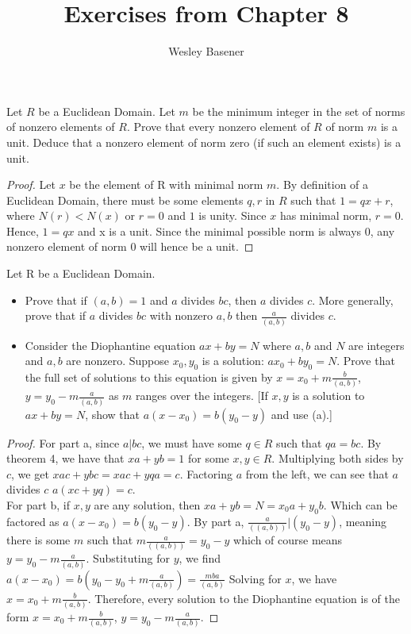 \documentclass[10pt]{article}
\newenvironment{problem}[2][Problem]{\begin{trivlist}
		\item[\hskip \labelsep {\bfseries #1}\hskip \labelsep {\bfseries #2.}]}{\end{trivlist}}
\begin{document}
	
	\title{Exercises from Chapter 8}
	\author{Wesley Basener}
	\maketitle
	
	\begin{problem}{1.3}
		Let $R$ be a Euclidean Domain. Let $\mathit{m}$ be the minimum integer in the set of norms of nonzero elements of $R$. Prove that every nonzero element of $R$ of norm $\mathit{m}$ is a unit. Deduce that a nonzero element of norm zero (if such an element exists) is a unit.
		\begin{proof}
			Let $x$ be the element of R with minimal norm $\mathit{m}$. By definition of a Euclidean Domain, there must be some elements $q, r$ in $R$ such that $1 = qx + r$, where $N(r)<N(x)$ or $r=0$ and $1$ is unity. Since $x$ has minimal norm, $r=0$. Hence, $1=qx$ and x is a unit. Since the minimal possible norm is always $0$, any nonzero element of norm $0$ will hence be a unit.
			\end{proof}
	\end{problem}
	
	\begin{problem}{1.4}
		Let R be a Euclidean Domain.\\
		\begin{itemize}
			
		
			\item[(a)] Prove that if $(a,b)=1$ and $a$ divides $bc$, then $a$ divides $c$. More generally, prove that if $a$ divides $bc$ with nonzero $a,b$ then $\frac{a}{(a,b)}$ divides $c$.
			\item[(b)] Consider the Diophantine equation $ax+by=N$ where $a,b$ and $N$ are integers and $a,b$ are nonzero. Suppose $x_{0}, y_{0}$ is a solution: $ax_{0}+by_{0}=N$. Prove that the full set of solutions to this equation is given by
			$x=x_{0} + m \frac{b}{(a,b)}$, $y=y_{0} - m \frac{a}{(a,b)}$
			as $m$ ranges over the integers. [If $x,y$ is a solution to $ax+by=N$, show that $a(x-x_{0}) = b(y_{0} - y)$ and use (a).]
		\end{itemize}
	
	
		\begin{proof}
			For part a, since $a|bc$, we must have some $q \in R$ such that $qa = bc$. By theorem 4, we have that $xa + yb = 1$ for some $x,y \in R$. Multiplying both sides by $c$, we get $xac + ybc = xac + yqa = c$. Factoring $a$ from the left, we can see that $a$ divides $c$ $a(xc + yq)=c$.
			\\
			For part b, if $x, y$ are any solution, then $xa + yb = N = x_{0}a + y_{0}b$. Which can be factored as $a(x-x_{0}) = b(y_{0} - y)$. By part a, $\frac{a}{((a,b))} | (y_{0} - y)$, meaning there is some $m$ such that $m\frac{a}{((a,b))} = y_{0} - y$ which of course means $y = y_{0} - m \frac{a}{(a,b)}$. Substituting for $y$, we find $a(x-x_{0}) = b(y_{0} - y_{0} + m\frac{a}{(a,b)}) = \frac{mba}{(a,b)}$ Solving for $x$, we have $x = x_{0} + m \frac{b}{(a,b)}$. Therefore, every solution to the Diophantine equation is of the form $x=x_{0} + m \frac{b}{(a,b)}$, $y=y_{0} - m \frac{a}{(a,b)}$.
		\end{proof}
	\end{problem}
	
\end{document}
